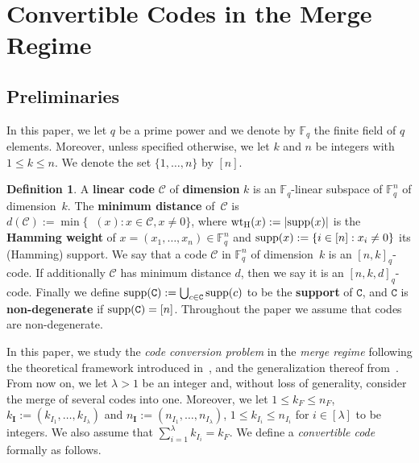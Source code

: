 \documentclass[conference, 10pt]{IEEEtran}
\theoremstyle{plain}
\theoremstyle{definition}
\newtheorem{definition}{Definition}
\newcommand{\C}{\mathtt{C}}
\newcommand{\numberset}{\mathbb}
\newcommand{\F}{\numberset{F}}
\newcommand{\supp}{\textup{supp}}
\newcommand{\mC}{\mathcal{C}}
\DeclareMathOperator{\wtH}{wt_H}
\begin{document}
\section{Convertible Codes in the Merge Regime}\label{sec2}

\subsection{Preliminaries}

In this paper, we let $q$ be a prime power and we denote by $\F_q$ the finite field of $q$ elements. Moreover, unless specified otherwise, we let $k$ and $n$ be integers with $1\le k \le n$. We denote the set $\{1,\dots, n\}$ by $[n]$.

\begin{definition}
    A \textbf{linear code} $\mC$ of \textbf{dimension} $k$ is an $\F_q$-linear subspace of $\F_q^n$ of dimension~$k$. The \textbf{minimum distance} of~$\mC$ is $d(\mC) := \min\{\wtH(x) : x \in \mC, x \ne 0\}$,
    where $\wtH(x):= |\supp(x)|$ is the \textbf{Hamming weight} of $x=(x_1,\dots, x_n) \in \F_q^n$ and $\supp(x) := \{i \in [n] :  x_i \ne 0\}$ its (Hamming) support. We say that a code $\mC$ in $\F_q^n$ of dimension~$k$ is an $[n,k]_q$-code. If additionally $\mC$ has minimum distance $d$, then we say it is an $[n,k,d]_q$-code. Finally we define $\supp(\C) := \bigcup_{c \in \C} \supp(c)$ to be the \textbf{support} of $\C$, and $\C$ is \textbf{non-degenerate} if $\supp(\C) = [n]$. Throughout the paper we assume that codes are non-degenerate.
\end{definition}



In this paper, we study the \textit{code conversion problem} in the \textit{merge regime} following the theoretical framework introduced in~\cite{maturana2022convertible}, and the generalization thereof from~\cite{ge2024mds}. From now on, we let $\lambda > 1$ be an integer and, without loss of generality, consider the merge of several codes into one. Moreover, we let $1 \le k_F \le n_F$, $k_\textbf{I}:=(k_{I_1},\dots,k_{I_\lambda})$ and $n_\textbf{I}:=(n_{I_1},\dots,n_{I_\lambda})$,  $1 \le k_{I_i} \le n_{I_i}$ for $i \in [\lambda]$ to be integers. We also assume that  $\sum_{i=1}^{\lambda} k_{I_i}=k_F$. We define a \textit{convertible code} formally as follows.
\end{document}
